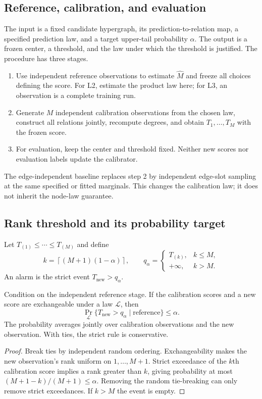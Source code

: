 \subsection{Reference, calibration, and evaluation}
The input is a fixed candidate hypergraph, its prediction-to-relation
map, a specified prediction law, and a target upper-tail probability
$\alpha$. The output is a frozen center, a threshold, and the law under
which the threshold is justified. The procedure has three stages.
\begin{enumerate}
\item Use independent reference observations to estimate $\widehat M$
and freeze all choices defining the score. For L2, estimate the product
law here; for L3, an observation is a complete training run.
\item Generate $M$ independent calibration observations from the chosen
law, construct all relations jointly, recompute degrees, and obtain
$T_1,\ldots,T_M$ with the frozen score.
\item For evaluation, keep the center and threshold fixed. Neither new
scores nor evaluation labels update the calibrator.
\end{enumerate}
The edge-independent baseline replaces step 2 by independent edge-slot
sampling at the same specified or fitted marginals. This changes the
calibration law; it does not inherit the node-law guarantee.

\subsection{Rank threshold and its probability target}
Let $T_{(1)}\le\cdots\le T_{(M)}$ and define
\begin{equation}\label{eq:rank-threshold}
k=\left\lceil(M+1)(1-\alpha)\right\rceil,\qquad
q_\alpha=\begin{cases}T_{(k)},& k\le M,\\+\infty,& k>M.\end{cases}
\end{equation}
An alarm is the strict event $T_{\mathrm{new}}>q_\alpha$.

\begin{proposition}\label{prop:rank}
Condition on the independent reference stage. If the calibration
scores and a new score are exchangeable under a law $\mathcal L$, then
\begin{equation}\label{eq:rank-validity}
\Pr_{\mathcal L}\{T_{\mathrm{new}}>q_\alpha\mid\mathrm{reference}\}
\le\alpha.
\end{equation}
The probability averages jointly over calibration observations and
the new observation. With ties, the strict rule is conservative.
\end{proposition}
\begin{proof}
Break ties by independent random ordering. Exchangeability makes the
new observation's rank uniform on $1,\ldots,M+1$. Strict exceedance of
the $k$th calibration score implies a rank greater than $k$, giving
probability at most $(M+1-k)/(M+1)\le\alpha$. Removing the random
tie-breaking can only remove strict exceedances. If $k>M$ the event is
empty.
\end{proof}

